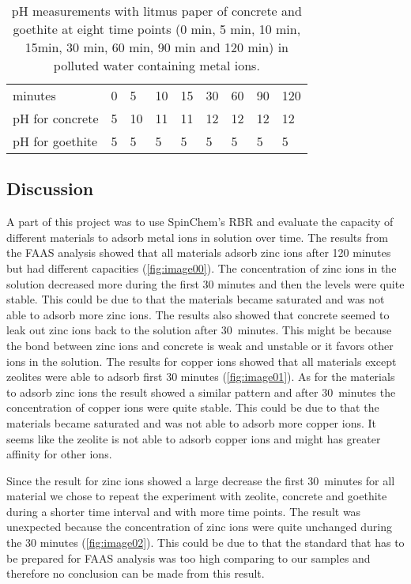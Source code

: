 \begin{table}[H]
\centering
\caption{pH measurements with litmus paper of concrete and goethite at eight
    time points (0 min, 5 min, 10 min, 15min, 30 min, 60 min, 90 min and 120
            min) in polluted water containing metal ions.}
\label{tab:ph}
\begin{tabular}{lllllllll}
minutes         & 0 & 5 & 10 & 15 & 30 & 60 & 90 & 120 \\
pH for concrete & 5 & 10 & 11 & 11 & 12 & 12 & 12 & 12 \\
pH for goethite & 5 & 5 & 5 & 5 & 5 & 5 & 5 & 5
\end{tabular}
\end{table}

\subsection{Discussion}
A part of this project was to use SpinChem's RBR and evaluate the capacity of different materials to adsorb metal ions in solution over time. The results from the FAAS analysis showed that all materials adsorb zinc ions after 120 minutes but had different capacities (\cref{fig:image00}). The concentration of zinc ions in the solution decreased more during the first 30 minutes and then the levels were quite stable. This could be due to that the materials became saturated and was not able to adsorb more zinc ions. The results also showed that concrete seemed to leak out zinc ions back to the solution after 30~minutes. This might be because the bond between zinc ions and concrete is weak and unstable or it favors other ions in the solution. The results for copper ions showed that all materials except zeolites were able to adsorb first 30 minutes (\cref{fig:image01}). As for the materials to adsorb zinc ions the result showed a similar pattern and after 30~minutes the concentration of copper ions were quite stable. This could be due to that the materials became saturated and was not able to adsorb more copper ions. It seems like the zeolite is not able to adsorb copper ions and might has greater affinity for other ions. 

Since the result for zinc ions showed a large decrease the first 30~minutes for all material we chose to repeat the experiment with zeolite, concrete and goethite during a shorter time interval and with more time points. The result was unexpected because the concentration of zinc ions were quite unchanged during the 30 minutes (\cref{fig:image02}). This could be due to that the standard that has to be prepared for FAAS analysis was too high comparing to our samples and therefore no conclusion can be made from this result. 

